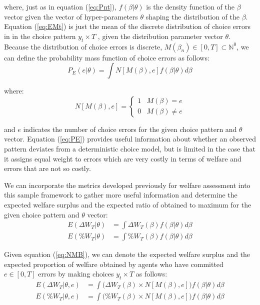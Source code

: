\documentclass[../main.tex]{subfiles}
\begin{document}
\noindent where, just as in equation (\ref{eq:Pnt}), $f(\beta|\theta)$ is the density function of the $\beta$ vector given the vector of hyper-parameters $\theta$ shaping the distribution of the $\beta$.
Equation (\ref{eq:EMt}) is just the mean of the discrete distribution of choice errors in in the choice pattern $y_t \times T$ , given the distribution parameter vector $\theta$.
Because the distribution of choice errors is discrete, $M(\beta_n) \in [0,T] \subset \mathbb{N}^0$,{\footnotemark} we can define the probability mass function of choice errors as follows:
\begin{equation}
	\label{eq:PE}
	P_E(e | \theta) = \int N[M(\beta),e] f(\beta|\theta) d \beta
\end{equation}

\addtocounter{footnote}{-1}

\noindent where:
\begin{equation}
	\label{eq:NMB}
	N[M(\beta), e] = 
	\begin{cases}
		1 & M(\beta) = e\\
		0 & M(\beta) \neq e
	\end{cases}
\end{equation}

\noindent and $e$ indicates the number of choice errors for the given choice pattern and $\theta$ vector.
Equation (\ref{eq:PE}) provides useful information about whether an observed pattern deviates from a deterministic choice model, but is limited in the case that it assigns equal weight to errors which are very costly in terms of welfare and errors that are not so costly.

We can incorporate the metrics developed previously for welfare assessment into this sample framework to gather more useful information and determine the expected welfare surplus and the expected ratio of obtained {\CE} to maximum {\CE} for the given choice pattern and $\theta$ vector:
\begin{align}
	E( \Delta W_T | \theta) &= \int \Delta W_T(\beta) f(\beta | \theta) d \beta \label{eq:EDWT}\\
	E( \% W_T | \theta) &= \int \% W_T(\beta) f(\beta | \theta) d \beta \label{eq:EPWT}
\end{align}

Given equation (\ref{eq:NMB}), we can denote the expected welfare surplus and the expected proportion of welfare obtained by agents who have committed $e \in [0,T]$ errors by making choices $y_t \times T$ as follows:
\begin{align}
	E( \Delta W_T | \theta, e) &= \int \bigr( \Delta W_T(\beta) \times N[M(\beta),e] \bigr) f(\beta | \theta) d \beta \label{eq:EDWTe}\\
	E( \% W_T | \theta, e) &= \int \bigl( \% W_T(\beta) \times N[M(\beta),e] \bigr) f(\beta | \theta) d \beta \label{eq:EPWTe}
\end{align}
\end{document}
